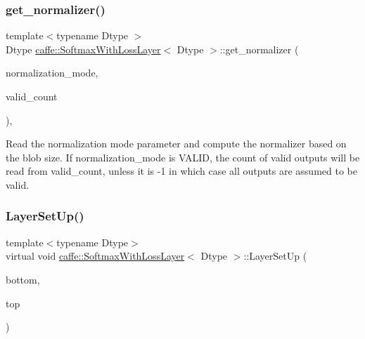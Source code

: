 \subsubsection{\texorpdfstring{get\+\_\+normalizer()}{get\_normalizer()}\hspace{0.1cm}{\footnotesize\ttfamily [2/2]}}
{\footnotesize\ttfamily template$<$typename Dtype $>$ \\
Dtype \mbox{\hyperlink{classcaffe_1_1_softmax_with_loss_layer}{caffe\+::\+Softmax\+With\+Loss\+Layer}}$<$ Dtype $>$\+::get\+\_\+normalizer (\begin{DoxyParamCaption}\item[{Loss\+Parameter\+\_\+\+Normalization\+Mode}]{normalization\+\_\+mode,  }\item[{int}]{valid\+\_\+count }\end{DoxyParamCaption})\hspace{0.3cm}{\ttfamily [protected]}, {\ttfamily [virtual]}}

Read the normalization mode parameter and compute the normalizer based on the blob size. If normalization\+\_\+mode is V\+A\+L\+ID, the count of valid outputs will be read from valid\+\_\+count, unless it is -\/1 in which case all outputs are assumed to be valid. \mbox{\label{classcaffe_1_1_softmax_with_loss_layer_a2a3985570178431a4cc3f9b9fd4378c2}} 
\subsubsection{\texorpdfstring{Layer\+Set\+Up()}{LayerSetUp()}\hspace{0.1cm}{\footnotesize\ttfamily [1/2]}}
{\footnotesize\ttfamily template$<$typename Dtype$>$ \\
virtual void \mbox{\hyperlink{classcaffe_1_1_softmax_with_loss_layer}{caffe\+::\+Softmax\+With\+Loss\+Layer}}$<$ Dtype $>$\+::Layer\+Set\+Up (\begin{DoxyParamCaption}\item[{const vector$<$ \mbox{\hyperlink{classcaffe_1_1_blob}{Blob}}$<$ Dtype $>$ $\ast$$>$ \&}]{bottom,  }\item[{const vector$<$ \mbox{\hyperlink{classcaffe_1_1_blob}{Blob}}$<$ Dtype $>$ $\ast$$>$ \&}]{top }\end{DoxyParamCaption})\hspace{0.3cm}{\ttfamily [virtual]}}



